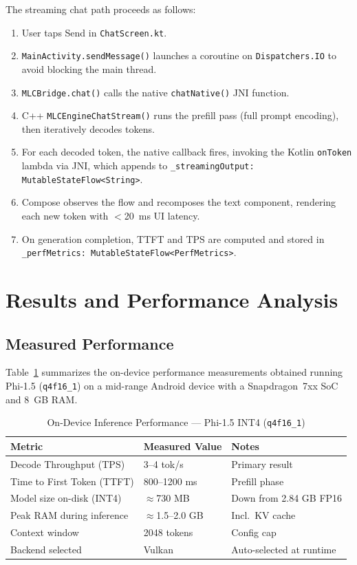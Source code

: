 \documentclass[12pt,letterpaper]{article}
\begin{document}
The streaming chat path proceeds as follows:
\begin{enumerate}[noitemsep]
    \item User taps Send in \texttt{ChatScreen.kt}.
    \item \texttt{MainActivity.sendMessage()} launches a coroutine on
          \texttt{Dispatchers.IO} to avoid blocking the main thread.
    \item \texttt{MLCBridge.chat()} calls the native \texttt{chatNative()} JNI function.
    \item C++ \texttt{MLCEngineChatStream()} runs the prefill pass (full prompt encoding),
          then iteratively decodes tokens.
    \item For each decoded token, the native callback fires, invoking the Kotlin
          \texttt{onToken} lambda via JNI, which appends to
          \texttt{\_streamingOutput: MutableStateFlow<String>}.
    \item Compose observes the flow and recomposes the text component, rendering
          each new token with $<$20~ms UI latency.
    \item On generation completion, TTFT and TPS are computed and stored in
          \texttt{\_perfMetrics: MutableStateFlow<PerfMetrics>}.
\end{enumerate}

\section{Results and Performance Analysis}

\subsection{Measured Performance}

Table~\ref{tab:results} summarizes the on-device performance measurements
obtained running Phi-1.5 (\texttt{q4f16\_1}) on a mid-range Android device
with a Snapdragon~7xx SoC and 8~GB RAM.

\begin{table}[H]
\centering
\caption{On-Device Inference Performance --- Phi-1.5 INT4 (\texttt{q4f16\_1})}
\begin{tabular}{lll}
\toprule
\textbf{Metric} & \textbf{Measured Value} & \textbf{Notes} \\
\midrule
Decode Throughput (TPS) & 3--4 tok/s & Primary result \\
Time to First Token (TTFT) & 800--1200 ms & Prefill phase \\
Model size on-disk (INT4) & $\approx$730 MB & Down from 2.84 GB FP16 \\
Peak RAM during inference & $\approx$1.5--2.0 GB & Incl.\ KV cache \\
Context window & 2048 tokens & Config cap \\
Backend selected & Vulkan & Auto-selected at runtime \\
\bottomrule
\end{tabular}
\label{tab:results}
\end{table}
\end{document}
